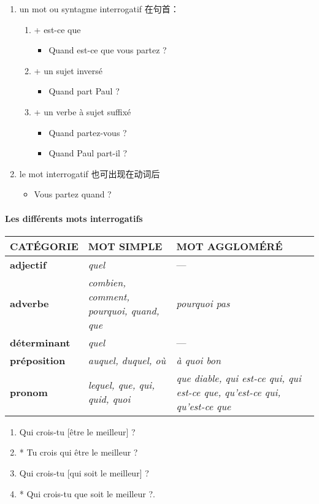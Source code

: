 \documentclass[UTF8]{report}
\begin{document}
\begin{enumerate}
    \item un mot ou syntagme interrogatif 在句首：
    \begin{enumerate}
        \item + est-ce que
        \begin{itemize}
            \item Quand est-ce que vous partez ?
        \end{itemize}
        \item + un sujet inversé
        \begin{itemize}
            \item Quand part Paul ?
        \end{itemize}
        \item + un verbe à sujet suffixé
        \begin{itemize}
            \item Quand partez-vous ?
            \item Quand Paul part-il ?
        \end{itemize}
    \end{enumerate}
    \item le mot interrogatif 也可出现在动词后
    \begin{itemize}
        \item Vous partez quand ?
    \end{itemize}
\end{enumerate}


\paragraph{Les différents mots interrogatifs}

\begin{table}[H]
\centering
\renewcommand{\arraystretch}{1.3}
\begin{tabular}{|>{\bfseries}l|p{6cm}|p{6cm}|}
\hline
\rowcolor{cyan!20}
CATÉGORIE & \textbf{MOT SIMPLE} & \textbf{MOT AGGLOMÉRÉ} \\
\hline
adjectif & \textit{quel} & --- \\
\hline
adverbe & \textit{combien, comment, pourquoi, quand, que} & \textit{pourquoi pas} \\
\hline
déterminant & \textit{quel} & --- \\
\hline
préposition & \textit{auquel, duquel, où} & \textit{à quoi bon} \\
\hline
pronom & \textit{lequel, que, qui, quid, quoi} & \textit{que diable, qui est-ce qui, qui est-ce que, qu’est-ce qui, qu’est-ce que} \\
\hline
\end{tabular}
\end{table}
\begin{enumerate}
    \item Qui crois-tu [être le meilleur] ?
    \item * Tu crois qui être le meilleur ?
    \item Qui crois-tu [qui soit le meilleur] ?
    \item * Qui crois-tu que soit le meilleur ?.
\end{enumerate}
\end{document}
